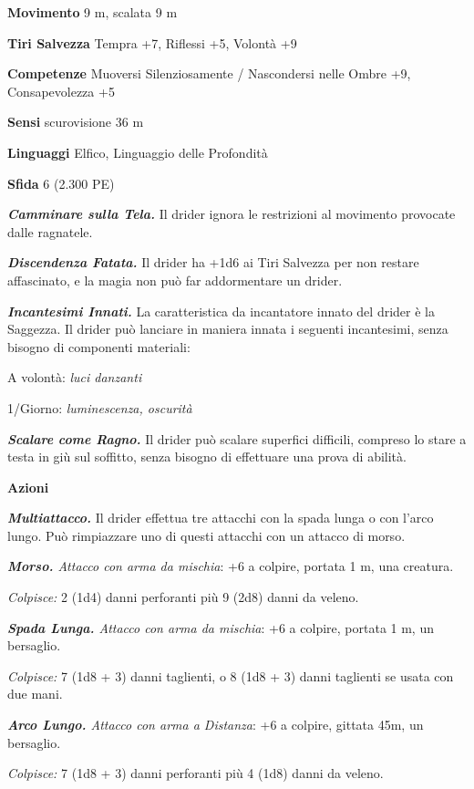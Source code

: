\begin{multicols}{2}
\textbf{Movimento} 9 m, scalata 9 m

\textbf{Tiri Salvezza} Tempra +7, Riflessi +5, Volontà +9

\textbf{Competenze} Muoversi Silenziosamente / Nascondersi nelle Ombre +9, Consapevolezza +5

\textbf{Sensi} scurovisione 36 m

\textbf{Linguaggi} Elfico, Linguaggio delle Profondità

\textbf{Sfida} 6 (2.300 PE)

\emph{\textbf{Camminare sulla Tela.}} Il drider ignora le restrizioni al movimento provocate dalle ragnatele.

\emph{\textbf{Discendenza Fatata.}} Il drider ha +1d6 ai Tiri Salvezza per non restare affascinato, e la magia non può far addormentare un drider.

\emph{\textbf{Incantesimi Innati.}} La caratteristica da incantatore innato del drider è la Saggezza. Il drider può lanciare in maniera innata i seguenti incantesimi, senza bisogno di componenti materiali:

A volontà: \emph{luci danzanti}

1/Giorno: \emph{luminescenza, oscurità}

\emph{\textbf{Scalare come Ragno.}} Il drider può scalare superfici difficili, compreso lo stare a testa in giù sul soffitto, senza bisogno di effettuare una prova di abilità.

\textbf{Azioni}

\emph{\textbf{Multiattacco.}} Il drider effettua tre attacchi con la spada lunga o con l'arco lungo. Può rimpiazzare uno di questi attacchi con un attacco di morso.

\emph{\textbf{Morso.} Attacco con arma da mischia}: +6 a colpire, portata 1 m, una creatura.

\emph{Colpisce:} 2 (1d4) danni perforanti più 9 (2d8) danni da veleno.

\emph{\textbf{Spada Lunga.} Attacco con arma da mischia}: +6 a colpire, portata 1 m, un bersaglio.

\emph{Colpisce:} 7 (1d8 + 3) danni taglienti, o 8 (1d8 + 3) danni taglienti se usata con due mani.

\emph{\textbf{Arco Lungo.} Attacco con arma a Distanza}: +6 a colpire, gittata 45m, un bersaglio.

\emph{Colpisce:} 7 (1d8 + 3) danni perforanti più 4 (1d8) danni da veleno.


\end{multicols}
